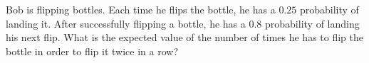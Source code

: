 Bob is flipping bottles. Each time he flips the bottle, he has a $0.25$ probability of landing it. After successfully flipping a bottle, he has a $0.8$ probability of landing his next flip. What is the expected value of the number of times he has to flip the bottle in order to flip it twice in a row?
